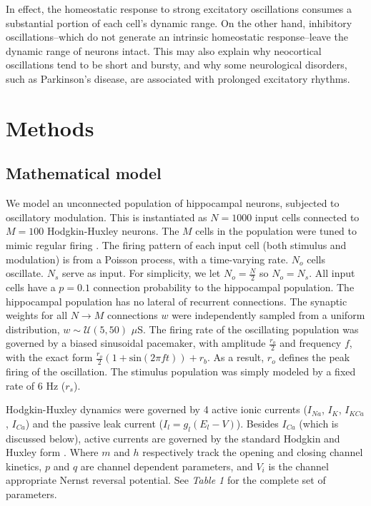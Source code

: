 \documentclass{article}
\begin{document}
In effect, the homeostatic response to strong excitatory oscillations consumes a substantial portion of each cell's dynamic range. On the other hand, inhibitory oscillations--which do not generate an intrinsic homeostatic response--leave the dynamic range of neurons intact. This may also explain why neocortical oscillations tend to be short and bursty, and why some neurological disorders, such as Parkinson's disease, are associated with prolonged excitatory rhythms.

\section*{Methods}
\subsection*{Mathematical model}
We model an unconnected population of hippocampal neurons, subjected to oscillatory modulation. This is instantiated as $N = 1000$ input cells connected to $M = 100$ Hodgkin-Huxley neurons. The $M$ cells in the population were tuned to mimic regular firing \cite{Borgers2005,Borgers2008}. The firing pattern of each input cell (both stimulus and modulation) is from a Poisson process, with a time-varying rate. $N_o$ cells oscillate. $N_s$ serve as input. For simplicity, we let $N_o = \frac{N}{2}$ so $N_o = N_s$. All input cells have a $p = 0.1$ connection probability to the hippocampal population. The hippocampal population has no lateral of recurrent connections. The synaptic weights for all $N \rightarrow M$ connections $w$ were independently sampled from a uniform distribution, $w \sim \mathcal{U}(5, 50)$ $\mu$S. The firing rate of the oscillating population was governed by a biased sinusoidal pacemaker, with amplitude $\frac{r_o}{2}$ and frequency $f$, with the exact form $\frac{r_o}{2} (1 + \text{sin}(2 \pi f t)) + r_b$. As a result, $r_o$ defines the peak firing of the oscillation. The stimulus population was simply modeled by a fixed rate of 6 Hz ($r_s$). 

Hodgkin-Huxley dynamics were governed by 4 active ionic currents ($I_{Na}$, $I_{K}$, $I_{KCa}$, $I_{Ca}$) and the passive leak current ($I_l = g_l (E_l - V)$). Besides $I_{Ca}$ (which is discussed below), active currents are governed by the standard Hodgkin and Huxley form \cite{Hodgkin1952}. Where $m$ and $h$ respectively track the opening and closing channel kinetics, $p$ and $q$ are channel dependent parameters, and $V_i$ is the channel appropriate Nernst reversal potential. See \textit{Table 1} for the complete set of parameters.
\end{document}

